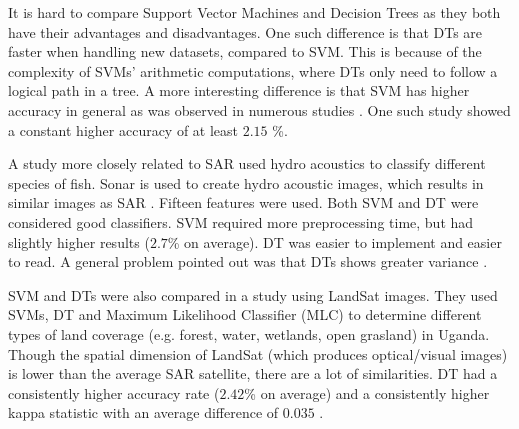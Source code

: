 It is hard to compare Support Vector Machines and Decision Trees as they both have their advantages and disadvantages. One such difference is that DTs are faster when handling new datasets, compared to SVM. This is because of the complexity of SVMs' arithmetic computations, where DTs only need to follow a logical path in a tree. A more interesting difference is that SVM has higher accuracy in general as was observed in numerous studies \cite{arun2010hybrid}. One such study showed a constant higher accuracy of at least $2.15$ \%.
 
A study more closely related to SAR used hydro acoustics to classify different species of fish. Sonar is used to create hydro acoustic images, which results in similar images as SAR \cite{griffiths2003synthetic}. Fifteen features were used. Both SVM and DT were considered good classifiers. SVM required more preprocessing time, but had slightly higher results ($2.7$\% on average). DT was easier to implement and easier to read. A general problem pointed out was that DTs shows greater variance \cite{Robotham2011170}.

SVM and DTs were also compared in a study using LandSat images. They used SVMs, DT and Maximum Likelihood Classifier (MLC) to determine different types of land coverage (e.g. forest, water, wetlands, open grasland) in Uganda. Though the spatial dimension of LandSat (which produces optical/visual images) is lower than the average SAR satellite, there are a lot of similarities. DT had a consistently higher accuracy rate ($2.42$\% on average) and a consistently higher kappa statistic with an average difference of $0.035$ \cite{Otukei2010S27}.



